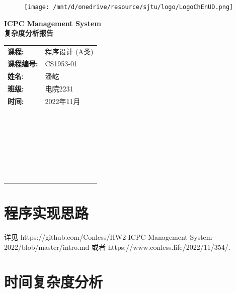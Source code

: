 \documentclass[UTF8, a4paper, 11pt]{ctexart}
\theoremstyle{definition}
\begin{document}
\thispagestyle{empty}

\begin{figure}[t]
    \centering
    \texttt{[image: /mnt/d/onedrive/resource/sjtu/logo/LogoChEnUD.png]}
\end{figure}

\vspace*{\fill}
\begin{center}
    \Huge\textbf{ICPC Management System}\\
    \Huge\textbf{复杂度分析报告}
\end{center}
\vspace*{\fill}

\begin{table}[b]
    \centering
    \large
    \begin{tabular}{ll}
        \textbf{课程:}     & 程序设计 (A类) \\
        \textbf{课程编号:} & CS1953-01      \\
        \textbf{姓名:}     & 潘屹           \\
        \textbf{班级:}     & 电院2231       \\
        \textbf{时间:}     & 2022年11月     \\
        ~                                   \\
        ~                                   \\
        ~                                   \\
        ~                                   \\
        ~                                   \\
        ~                                   \\
    \end{tabular}
\end{table}

\newpage

\thispagestyle{empty}

\section{程序实现思路}

详见 https://github.com/Conless/HW2-ICPC-Management-System-2022/blob/master/intro.md 或者 https://www.conless.life/2022/11/354/.

\section{时间复杂度分析}
\end{document}

